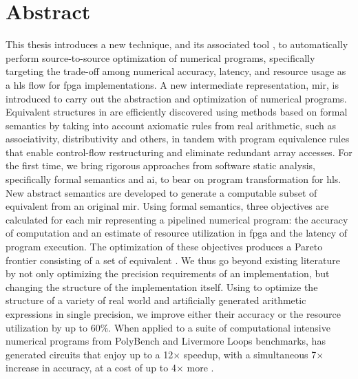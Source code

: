 \chapter*{Abstract}
\label{sec:abstract}
\vspace*{-10mm}

This thesis introduces a new technique, and its associated tool \soap, to
automatically perform source-to-source optimization of numerical programs,
specifically targeting the trade-off among numerical accuracy, latency, and
resource usage as a \acrlong{hls} flow for \acrshort{fpga} implementations.  A
new intermediate representation, \acrshort{mir}, is introduced to carry out
the abstraction and optimization of numerical programs.  Equivalent structures
in  are efficiently discovered using methods based on formal
semantics by taking into account axiomatic rules from real arithmetic, such as
associativity, distributivity and others, in tandem with program equivalence
rules that enable control-flow restructuring and eliminate redundant array
accesses.  For the first time, we bring rigorous approaches from software
static analysis, specifically formal semantics and \acrlong{ai}, to bear
on program transformation for \acrlong{hls}.  New abstract semantics are
developed to generate a computable subset of equivalent 
from an original \acrshort{mir}.  Using formal semantics, three objectives
are calculated for each \acrshort{mir} representing a pipelined numerical
program: the accuracy of computation and an estimate of resource utilization
in \acrshort{fpga} and the latency of program execution.  The optimization of
these objectives produces a Pareto frontier consisting of a set of equivalent
.  We thus go beyond existing literature by not only optimizing
the precision requirements of an implementation, but changing the structure
of the implementation itself.  Using \soap{} to optimize the structure of a
variety of real world and artificially generated arithmetic expressions in
single precision, we improve either their accuracy or the resource utilization
by up to 60\%.  When applied to a suite of computational intensive numerical
programs from PolyBench and Livermore Loops benchmarks, \soap{} has generated
circuits that enjoy up to a 12$\times$ speedup, with a simultaneous 7$\times$
increase in accuracy, at a cost of up to 4$\times$ more .
